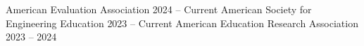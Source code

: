 

\begin{cvtable}
        {American Evaluation Association}
        {2024 -- Current}
        {}
    \cvitem{}
        {American Society for Engineering Education}
        {2023 -- Current}
        {}
    \cvitem{}
        {American Education Research Association}
        {2023 -- 2024}
        {}
\end{cvtable}
